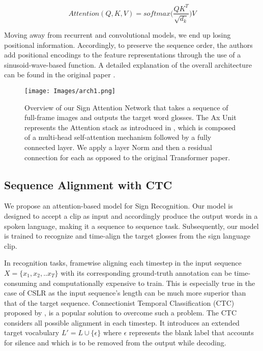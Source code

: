 \documentclass[a4paper,conference]{IEEEtran}
\begin{document}
\begin{equation}
Attention(Q,K,V) = softmax\Big(\frac{QK^{T}}{\sqrt{d_k}}\Big)V
\label{eq:1}
\end{equation}
	
Moving away from recurrent and convolutional models, we end up losing positional information. Accordingly, to preserve the sequence order, the authors add positional encodings to the feature representations through the use of a sinusoid-wave-based function.
A detailed explanation of the overall architecture can be found in the original paper \cite{vaswani2017attention}.

\begin{figure*}[t]
\centering
\texttt{[image: Images/arch1.png]}
\caption{Overview of our Sign Attention Network that takes a sequence of full-frame images and outputs the target word glosses. The Ax Unit represents the Attention stack as introduced in \cite{vaswani2017attention}, which is composed of a multi-head self-attention mechanism followed by a fully connected layer. We apply a layer Norm \cite{ba2016layer} and then a residual connection for each as opposed to the original Transformer paper.}
\label{fig:1}
\end{figure*}

\subsection{Sequence Alignment with CTC}
    
We propose an attention-based model for Sign Recognition. Our model is designed to accept a clip as input and accordingly produce the output words in a spoken language, making it a sequence to sequence task. Subsequently, our model is trained to recognize and time-align the target glosses from the sign language clip.

In recognition tasks, framewise aligning each timestep in the input sequence $X = \{x_1,x_2,..x_T\}$ with its corresponding ground-truth annotation can be time-consuming and computationally expensive to train. This is especially true in the case of CSLR as the input sequence's length can be much more superior than that of the target sequence. Connectionist Temporal Classification (CTC) proposed by \cite{graves2006connectionist}, is a popular solution to overcome such a problem. The CTC considers all possible alignment in each timestep. It introduces an extended target vocabulary $L'= L \cup \{\epsilon\}$ where $\epsilon$ represents the blank label that accounts for silence and which is to be removed from the output while decoding. 
\end{document}
